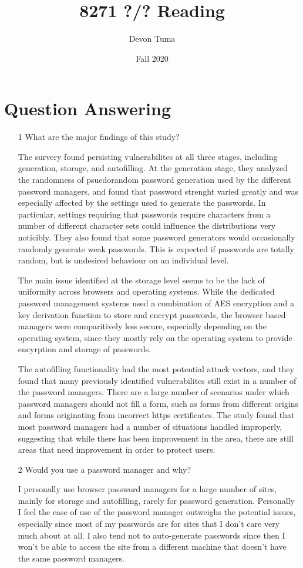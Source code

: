 \documentclass[11pt]{article}
\title{8271 ?/? Reading}
\author{Devon Tuma}
\date{Fall 2020}
\begin{document}
\maketitle

\section*{Question Answering}

\begin{itemize}
\item [1] What are the major findings of this study?

  The survery found persisting vulnerabilites at all three stages, including generation, storage, and autofilling.
  At the generation stage, they analyzed the randomness of psuedorandom password generation used by the different password managers, and found that password strenght varied greatly and was especially affected by the settings used to generate the passwords.
  In particular, settings requiring that passwords require characters from a number of different character sets could influence the distributions very noticibly.
  They also found that some password generators would occasionally randomly generate weak passwords.
  This is expected if passwords are totally random, but is undesired behaviour on an individual level.

  The main issue identified at the storage level seems to be the lack of uniformity across browsers and operating systems.
  While the dedicated password management systems used a combination of AES encryption and a key derivation function to store and encrypt passwords, the browser based managers were comparitively less secure, especially depending on the operating system, since they mostly rely on the operating system to provide encyrption and storage of passwords.

  The autofilling functionality had the most potential attack vectors, and they found that many previously identified vulnerabilites still exist in a number of the password managers.
  There are a large number of scenarios under which password managers should not fill a form, such as forms from different origins and forms originating from incorrect https certificates.
  The study found that most password managers had a number of situations handled improperly, suggesting that while there has been improvement in the area, there are still areas that need improvement in order to protect users.
  
\item [2] Would you use a password manager and why?

  I personally use browser password managers for a large number of sites, mainly for storage and autofilling, rarely for password generation.
  Personally I feel the ease of use of the password manager outweighs the potential issues, especially since most of my passwords are for sites that I don't care very much about at all.
  I also tend not to auto-generate passwords since then I won't be able to access the site from a different machine that doesn't have the same password managers.
  
\end{itemize}
\end{document}

